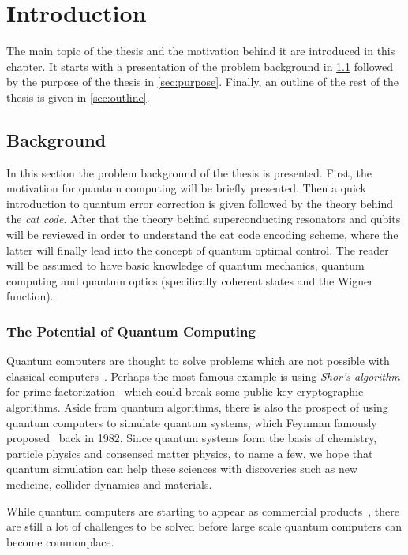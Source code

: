 \documentclass[main.tex]{subfiles}
\begin{document}
\chapter{Introduction}
The main topic of the thesis and the motivation behind it are introduced in this chapter.
It starts with a presentation of the problem background in \cref{sec:background} followed by the purpose of the thesis in \cref{sec:purpose}.
Finally, an outline of the rest of the thesis is given in \cref{sec:outline}.

\section{Background}%
\label{sec:background}
In this section the problem background of the thesis is presented.
First, the motivation for quantum computing will be briefly presented.
Then a quick introduction to quantum error correction is given followed by the theory behind the \emph{cat code}.
After that the theory behind superconducting resonators and qubits will be reviewed in order to understand the cat code encoding scheme, where the latter will finally lead into the concept of quantum optimal control.
The reader will be assumed to have basic knowledge of quantum mechanics, quantum computing and quantum optics (specifically coherent states and the Wigner function).

\subsection{The Potential of Quantum Computing}
Quantum computers are thought to solve problems which are not possible with classical computers~\cite{preskill_quantum_2018}.
Perhaps the most famous example is using \emph{Shor's algorithm} for prime factorization~\cite{shor_polynomial-time_1997} which could break some public key cryptographic algorithms.
Aside from quantum algorithms, there is also the prospect of using quantum computers to simulate quantum systems, which Feynman famously proposed~\cite{feynman_simulating_1982} back in 1982.
Since quantum systems form the basis of chemistry, particle physics and consensed matter physics, to name a few, we hope that quantum simulation can help these sciences with discoveries such as new medicine, collider dynamics and materials.  

While quantum computers are starting to appear as commercial products~\cite{santos_ibm_2016}, there are still a lot of challenges to be solved before large scale quantum computers can become commonplace.
\end{document}
